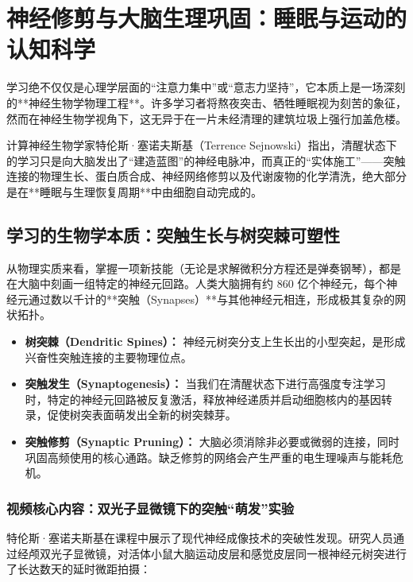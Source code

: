 \documentclass[12pt,a4paper,openany]{ctexbook}
\begin{document}
\chapter{神经修剪与大脑生理巩固：睡眠与运动的认知科学}

学习绝不仅仅是心理学层面的“注意力集中”或“意志力坚持”，它本质上是一场深刻的**神经生物学物理工程**。许多学习者将熬夜突击、牺牲睡眠视为刻苦的象征，然而在神经生物学视角下，这无异于在一片未经清理的建筑垃圾上强行加盖危楼。

计算神经生物学家特伦斯·塞诺夫斯基（Terrence Sejnowski）指出，清醒状态下的学习只是向大脑发出了“建造蓝图”的神经电脉冲，而真正的“实体施工”——突触连接的物理生长、蛋白质合成、神经网络修剪以及代谢废物的化学清洗，绝大部分是在**睡眠与生理恢复周期**中由细胞自动完成的。

\section{学习的生物学本质：突触生长与树突棘可塑性}

从物理实质来看，掌握一项新技能（无论是求解微积分方程还是弹奏钢琴），都是在大脑中刻画一组特定的神经元回路。人类大脑拥有约 860 亿个神经元，每个神经元通过数以千计的**突触（Synapses）**与其他神经元相连，形成极其复杂的网状拓扑。

\begin{keypoint}
\begin{itemize}
    \item \textbf{树突棘（Dendritic Spines）：} 神经元树突分支上生长出的小型突起，是形成兴奋性突触连接的主要物理位点。
    \item \textbf{突触发生（Synaptogenesis）：} 当我们在清醒状态下进行高强度专注学习时，特定的神经元回路被反复激活，释放神经递质并启动细胞核内的基因转录，促使树突表面萌发出全新的树突棘芽。
    \item \textbf{突触修剪（Synaptic Pruning）：} 大脑必须消除非必要或微弱的连接，同时巩固高频使用的核心通路。缺乏修剪的网络会产生严重的电生理噪声与能耗危机。
\end{itemize}
\end{keypoint}

\subsection*{视频核心内容：双光子显微镜下的突触“萌发”实验}

特伦斯·塞诺夫斯基在课程中展示了现代神经成像技术的突破性发现。研究人员通过经颅双光子显微镜，对活体小鼠大脑运动皮层和感觉皮层同一根神经元树突进行了长达数天的延时微距拍摄：
\end{document}
